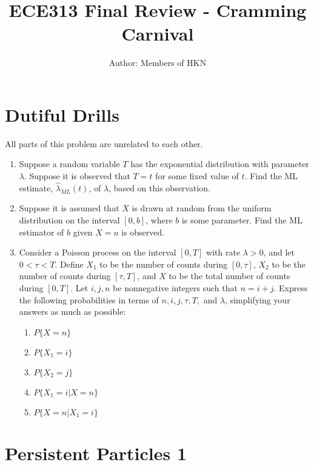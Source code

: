 \documentclass{article}
\title{ECE313 Final Review - Cramming Carnival}
\author{Author: Members of HKN}
\date{}
\begin{document}
\maketitle

\section{Dutiful Drills}

All parts of this problem are unrelated to each other.

\begin{enumerate}[label=(\alph*)]
\itemsep0em
    \item Suppose a random variable $T$ has the exponential distribution with parameter $\lambda$. Suppose it is observed that $T = t$ for some fixed value of $t$. Find the ML estimate, $\hat{\lambda}_{ML}(t)$, of $\lambda$, based on this observation. \vfill
    \item Suppose it is assumed that $X$ is drawn at random from the uniform distribution on the interval $[0, b]$, where $b$ is some parameter. Find the ML estimator of $b$ given $X = u$ is observed. \vfill
    \item Consider a Poisson process on the interval $[0, T]$ with rate $\lambda > 0$, and let $0 < \tau < T$. Define $X_1$ to be the number of counts during $[0, \tau]$, $X_2$ to be the number of counts during $[\tau, T]$, and $X$ to be the total number of counts during $[0, T]$. Let $i, j, n$ be nonnegative integers such that $n = i + j$. Express the following probabilities in terms of $n, i, j, \tau, T, $ and $\lambda$, simplifying your answers as much as possible:

    \begin{enumerate}[label=(\roman*)]
    \itemsep3em
        \item $P\{X = n\}$
        \item $P\{X_1 = i\}$
        \item $P\{X_2 = j\}$
        \item $P\{X_1 = i \vert X = n\}$
        \item $P\{X = n \vert X_1 = i\}$
    \end{enumerate}
\end{enumerate}

\vspace{3em}

\newpage

\section{Persistent Particles 1}
\end{document}

